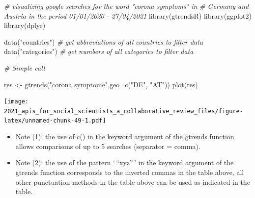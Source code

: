 \documentclass[
]{book}
\newenvironment{Shaded}{\begin{snugshade}}{\end{snugshade}}
\newcommand{\AttributeTok}[1]{\textcolor[rgb]{0.77,0.63,0.00}{#1}}
\newcommand{\CommentTok}[1]{\textcolor[rgb]{0.56,0.35,0.01}{\textit{#1}}}
\newcommand{\FunctionTok}[1]{\textcolor[rgb]{0.00,0.00,0.00}{#1}}
\newcommand{\NormalTok}[1]{#1}
\newcommand{\OtherTok}[1]{\textcolor[rgb]{0.56,0.35,0.01}{#1}}
\newcommand{\StringTok}[1]{\textcolor[rgb]{0.31,0.60,0.02}{#1}}
\providecommand{\tightlist}{%
  \setlength{\itemsep}{0pt}\setlength{\parskip}{0pt}}
\begin{document}
\begin{Shaded}
\begin{Highlighting}[]
\CommentTok{\# visualizing google searches for the word "corona symptoms" in }
\CommentTok{\# Germany and Austria in the period 01/01/2020 {-} 27/04/2021}
\FunctionTok{library}\NormalTok{(gtrendsR)}
\FunctionTok{library}\NormalTok{(ggplot2)}
\FunctionTok{library}\NormalTok{(dplyr)}

\FunctionTok{data}\NormalTok{(}\StringTok{"countries"}\NormalTok{) }\CommentTok{\# get abbreviations of all countries to filter data }
\FunctionTok{data}\NormalTok{(}\StringTok{"categories"}\NormalTok{) }\CommentTok{\# get numbers of all categories to filter data }

\CommentTok{\# Simple call}

\NormalTok{res }\OtherTok{\textless{}{-}} \FunctionTok{gtrends}\NormalTok{(}\StringTok{"corona symptome"}\NormalTok{,}\AttributeTok{geo=}\FunctionTok{c}\NormalTok{(}\StringTok{"DE"}\NormalTok{, }\StringTok{"AT"}\NormalTok{))}
\FunctionTok{plot}\NormalTok{(res)}
\end{Highlighting}
\end{Shaded}

\texttt{[image: 2021\_apis\_for\_social\_scientists\_a\_collaborative\_review\_files/figure-latex/unnamed-chunk-49-1.pdf]}

\begin{itemize}
\tightlist
\item
  Note (1): the use of c() in the keyword argument of the gtrends function allows comparisons of up to 5 searches (separator = comma).\\
\item
  Note (2): the use of the pattern `\,``xyz''\,' in the keyword argument of the gtrends function corresponds to the inverted commas in the table above, all other punctuation methods in the table above can be used as indicated in the table.
\end{itemize}
\end{document}
